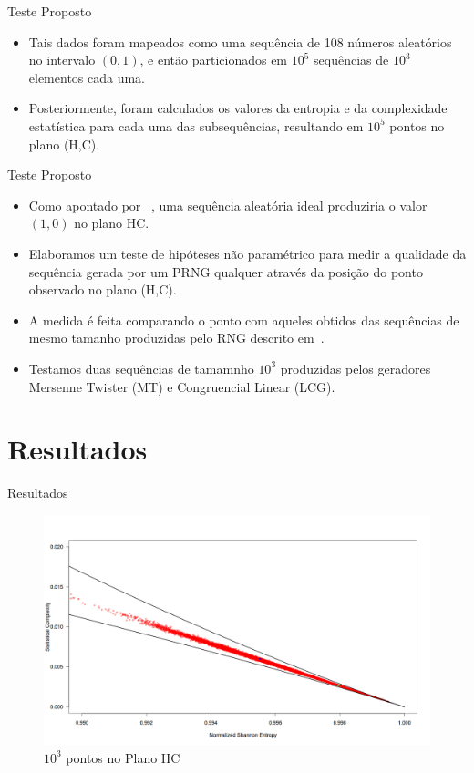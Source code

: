 \documentclass[xcolor=dvipsnames]{beamer}
\begin{document}
\begin{frame}{Teste Proposto}
    \begin{itemize}
     \item Tais dados foram mapeados como uma sequência de 108 números aleatórios no intervalo $(0,1)$, e então particionados em $10^5$ sequências de $10^3$ elementos cada uma.
     \pause
     \item Posteriormente, foram calculados os valores da entropia e da complexidade estatística para cada uma das subsequências, resultando em $10^5$ pontos no plano (H,C).
    \end{itemize}
\end{frame}

\begin{frame}{Teste Proposto}
    \begin{itemize}
     \item Como apontado por~\cite[Larrondo]{Larrondo:13} , uma sequência aleatória ideal produziria o valor $(1,0)$ no plano HC. 
     \pause
     \item Elaboramos um teste de hipóteses não paramétrico para medir a qualidade da sequência gerada por um PRNG qualquer através da posição do ponto observado no plano (H,C).
     \pause
     \item A medida é feita comparando o ponto com aqueles obtidos das sequências de mesmo tamanho produzidas pelo RNG descrito em~\cite{Gabriel2010}.
     \pause
     \item Testamos duas sequências de tamamnho $10^3$ produzidas pelos geradores Mersenne Twister (MT) e Congruencial Linear (LCG).
    \end{itemize}
\end{frame}

\section{Resultados}
\begin{frame}{Resultados}
    \begin{figure}
      \includegraphics[scale=0.25,center]{../Rplot}
      \caption{$10^3$ pontos no Plano HC}
      \end{figure}
\end{frame}
\end{document}
